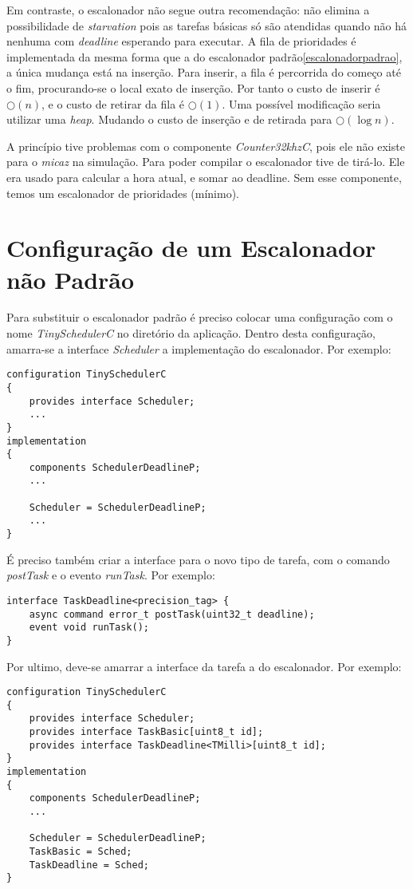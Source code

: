 \documentclass[a4paper,onecolumn, 10pt]{article}
\begin{document}
Em contraste, o escalonador não segue outra recomendação: não elimina a possibilidade de \textit{starvation} pois as tarefas
básicas só são atendidas quando não há nenhuma com \textit{deadline} esperando para executar. A fila de prioridades é
implementada da mesma forma que a do escalonador padrão\ref{escalonadorpadrao}, a única mudança está na inserção. Para
inserir, a fila é percorrida do começo até o fim, procurando-se o local exato de inserção.
Por tanto o custo de inserir é $\bigcirc(n)$, e o custo de retirar da fila é $\bigcirc(1)$. 
Uma possível modificação seria utilizar uma \textit{heap}. Mudando o custo de inserção e de retirada para $\bigcirc(\log
n)$.

A princípio tive problemas com o componente \textit{Counter32khzC}, 
pois ele não existe para o \textit{micaz} na simulação. Para poder compilar o
escalonador tive de tirá-lo. Ele era usado para calcular a hora atual, e somar ao deadline. Sem esse componente, temos
um escalonador de prioridades (mínimo). 


\section{Configuração de um Escalonador não Padrão}\label{configescalonador_naopadrao}
Para substituir o escalonador padrão é preciso colocar uma configuração com o nome \textit{TinySchedulerC} no diretório
da aplicação. Dentro desta configuração, amarra-se a interface \textit{Scheduler} a implementação do escalonador. Por
exemplo:
\begin{lstlisting}
configuration TinySchedulerC 
{
    provides interface Scheduler;
    ...
}
implementation 
{
    components SchedulerDeadlineP;
    ...

    Scheduler = SchedulerDeadlineP;
    ...
}
\end{lstlisting}

É preciso também criar a interface para o novo tipo de tarefa, com o comando \textit{postTask} e o evento
\textit{runTask}. Por exemplo:
\begin{lstlisting}
interface TaskDeadline<precision_tag> { 
    async command error_t postTask(uint32_t deadline);
    event void runTask();
}
\end{lstlisting}

Por ultimo, deve-se amarrar a interface da tarefa a do escalonador. Por exemplo:
\begin{lstlisting}
configuration TinySchedulerC 
{
    provides interface Scheduler;
    provides interface TaskBasic[uint8_t id];
    provides interface TaskDeadline<TMilli>[uint8_t id];
}
implementation 
{
    components SchedulerDeadlineP;
    ...

    Scheduler = SchedulerDeadlineP;
    TaskBasic = Sched;
    TaskDeadline = Sched;
}
\end{lstlisting}
\end{document}
